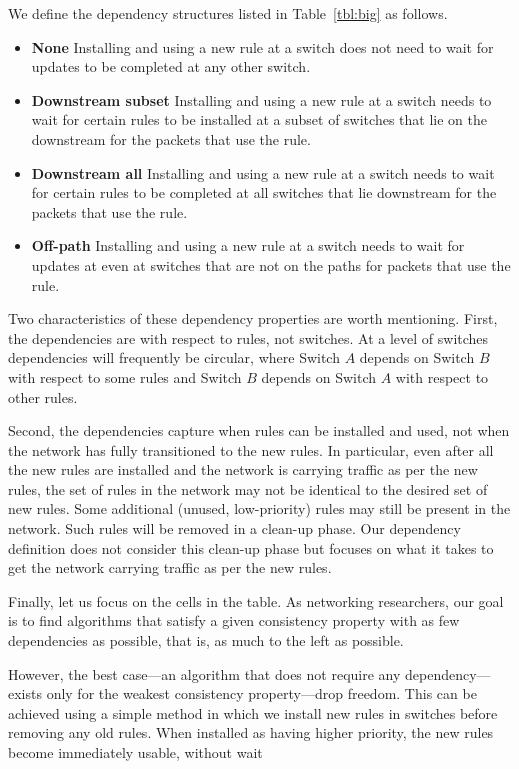 We define the dependency structures listed in Table~\ref{tbl:big} as follows.

\begin{itemize}

\item
\textbf{None} Installing and using a new rule at a switch does not need to wait for updates to be completed at any other switch.

\item
\textbf{Downstream subset} Installing and using a new rule at a switch needs to wait for certain rules to be installed at a subset of switches that lie on the downstream for the packets that use the rule.

\item
\textbf{Downstream all} Installing and using a new rule at a switch needs to wait for certain rules to be completed at all switches that lie downstream for the packets that use the rule.

\item
\textbf{Off-path} Installing and using a new rule at a switch needs to wait for updates at even at switches that are not on the paths for packets that use the rule.

\end{itemize}

Two characteristics of these dependency properties are worth mentioning. First, the dependencies are with respect to rules, not switches. At a level of switches dependencies will frequently be circular, where Switch $A$ depends on Switch $B$ with respect to some rules and Switch $B$ depends on Switch $A$ with respect to other rules.

Second, the dependencies capture when rules can be installed and used, not when the network has fully transitioned to the new rules. In particular, even after all the new rules are installed and the network is carrying traffic as per the new rules, the set of rules in the network may not be identical to the desired set of new rules. Some additional (unused, low-priority) rules may still be present in the network. Such rules will be removed in a clean-up phase. Our dependency definition does not consider this clean-up phase but focuses on what it takes to get the network carrying traffic as per the new rules.

Finally, let us focus on the cells in the table. As networking researchers, our goal is to find algorithms that satisfy a given consistency property with as few dependencies as possible, that is, as much to the left as possible. 

However, the best case---an algorithm that does not require any dependency---exists only for the weakest consistency property---drop freedom. This can be achieved using a simple method in which we install new rules in switches before removing any old rules. When installed as having higher priority, the new rules become immediately usable, without wait 